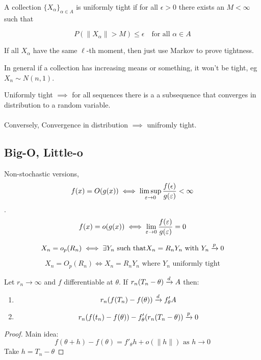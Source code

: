 \documentclass{article}
\begin{document}
\begin{definition}
A collection $\{X_\alpha\}_{\alpha \in A}$ is uniformly tight if for all $\epsilon>0$ there exists an $M<\infty$ such that 

$$P(\|X_\alpha\|>M) \leq \epsilon \quad \text{for all } \alpha \in A$$
\end{definition}
\begin{example}
If all $X_\alpha$ have the same $\ell$-th moment, then just use Markov to prove tightness. 
\end{example}
In general if a collection has increasing means or something, it won't be tight, eg $X_n \sim N(n,1)$. 

\begin{theorem}[Prohorov]
Uniformly tight $\implies$ for all sequences there is a a subsequence that converges in distribution to a random variable.\\\\
Conversely, 
Convergence in distribution $\implies$ unifromly tight. 
\end{theorem}


\subsection{Big-O, Little-o}
Non-stochastic versions, 
$$f(x) = O(g(x)) \iff \limsup_{\varepsilon\to 0} \frac{f(\epsilon)}{g(\varepsilon)} < \infty$$.
$$f(x) = o(g(x)) \iff \lim_{\varepsilon \to 0} \frac{f(\varepsilon)}{g(\varepsilon)} = 0 $$

\begin{definition}[Little-${o_p}$]
$$X_n = o_p(R_n) \iff \exists Y_n \text{ such that} X_n = R_n Y_n \text{ with } Y_n \xrightarrow{p} 0$$
\end{definition}
\begin{definition}[Big $O_p$]
$$X_n = O_p(R_n) \iff X_n = R_n Y_n \text{ where } Y_n \text{ uniformly tight}$$
\end{definition}

\begin{theorem}
Let $r_n\to \infty$ and $f$ differentiable at $\theta$. If $r_n (T_n -\theta)\xrightarrow{d} A$ then:
\begin{enumerate}
	\item $$r_n(f(T_n) - f(\theta)) \xrightarrow{d} f'_\theta A$$
	\item $$r_n(f(t_n) - f(\theta)) - f_\theta'(r_n (T_n - \theta)) \xrightarrow{p} 0$$
\end{enumerate}
\begin{proof}
	Main idea:
	$$f(\theta + h) - f(\theta) = f'_\theta h + o(\|h \|) \text{ as } h\to 0$$
	Take $h = T_n - \theta$ 
\end{proof}

\end{theorem}
\begin{theorem}
\end{theorem}
\end{document}
